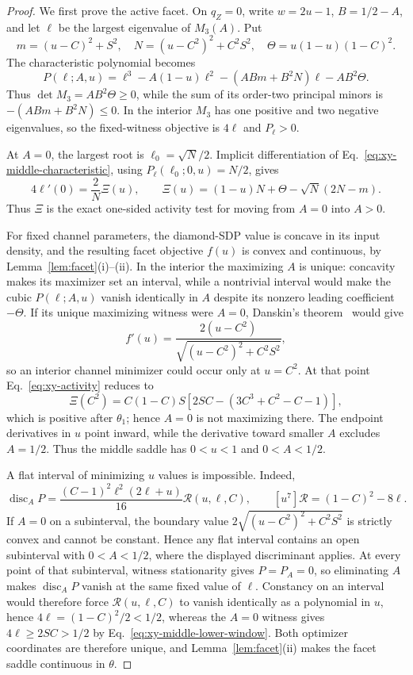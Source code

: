 \documentclass[11pt,a4paper]{article}
\theoremstyle{remark}
\begin{document}
\begin{proof}
We first prove the active facet.  On $q_Z=0$, write $w=2u-1$,
$B=1/2-A$, and let $\ell$ be the largest eigenvalue of $M_3(A)$.  Put
\[
 m=(u-C)^2+S^2,\quad N=(u-C^2)^2+C^2S^2,\quad
 \Theta=u(1-u)(1-C)^2.
\]
The characteristic polynomial becomes
\begin{equation}
 P(\ell;A,u)=\ell^3-A(1-u)\ell^2
 -(ABm+B^2N)\ell-AB^2\Theta.
 \label{eq:xy-middle-characteristic}
\end{equation}
Thus $\det M_3=AB^2\Theta\geq0$, while the sum of its order-two
principal minors is $-(ABm+B^2N)\leq0$.  In the interior $M_3$ has one
positive and two negative eigenvalues, so the fixed-witness objective is
$4\ell$ and $P_\ell>0$.

At $A=0$, the largest root is $\ell_0=\sqrt N/2$.  Implicit differentiation
of Eq.~\eqref{eq:xy-middle-characteristic}, using
$P_\ell(\ell_0;0,u)=N/2$, gives
\begin{equation}
 4\ell'(0)=\frac{2}{N}\Xi(u),\qquad
 \Xi(u)=(1-u)N+\Theta-\sqrt N(2N-m).
 \label{eq:xy-activity}
\end{equation}
Thus $\Xi$ is the exact one-sided activity test for moving from $A=0$ into
$A>0$.

For fixed channel parameters, the diamond-SDP value is concave in its input
density, and the resulting facet objective $f(u)$ is convex and continuous,
by Lemma~\ref{lem:facet}(i)--(ii).  In the interior the maximizing $A$ is
unique: concavity makes its maximizer set an interval, while a nontrivial
interval would make the cubic $P(\ell;A,u)$ vanish identically in $A$ despite
its nonzero leading coefficient $-\Theta$.
If its unique maximizing witness were $A=0$, Danskin's
theorem~\cite{danskin1967} would give
\[
 f'(u)=\frac{2(u-C^2)}
 {\sqrt{(u-C^2)^2+C^2S^2}},
\]
so an interior channel minimizer could occur only at $u=C^2$.  At that point
Eq.~\eqref{eq:xy-activity} reduces to
\[
 \Xi(C^2)=
 C(1-C)S[2SC-(3C^3+C^2-C-1)],
\]
which is positive after $\theta_1$; hence $A=0$ is not maximizing there.
The endpoint derivatives in $u$ point inward, while the derivative toward
smaller $A$ excludes $A=1/2$.  Thus the middle saddle has
$0<u<1$ and $0<A<1/2$.

A flat interval of minimizing $u$ values is impossible.  Indeed,
\[
 \operatorname{disc}_A P
 =\frac{(C-1)^2\ell^2(2\ell+u)}{16}\mathcal R(u,\ell,C),
 \qquad [u^7]\mathcal R=(1-C)^2-8\ell.
\]
If $A=0$ on a subinterval, the boundary value
$2\sqrt{(u-C^2)^2+C^2S^2}$ is strictly convex and cannot be constant.
Hence any flat interval contains an open subinterval with $0<A<1/2$, where
the displayed discriminant applies.
At every point of that subinterval, witness stationarity gives
$P=P_A=0$, so eliminating $A$ makes
$\operatorname{disc}_A P$ vanish at the same fixed value of $\ell$.
Constancy on an interval would therefore force
$\mathcal R(u,\ell,C)$ to vanish identically as a polynomial in $u$, hence
$4\ell=(1-C)^2/2<1/2$, whereas the $A=0$ witness gives
$4\ell\geq2SC>1/2$ by
Eq.~\eqref{eq:xy-middle-lower-window}.  Both optimizer coordinates are
therefore unique, and Lemma~\ref{lem:facet}(ii) makes the facet saddle
continuous in $\theta$.


\end{proof}
\end{document}
